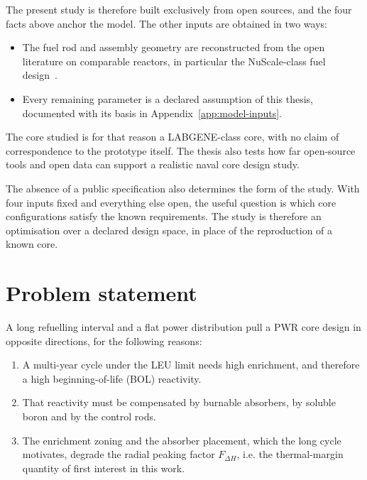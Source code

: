 The present study is therefore built exclusively from open sources, and the
four facts above anchor the model. The other inputs are obtained in two
ways:

\begin{itemize}
  \item The fuel rod and assembly geometry are reconstructed from the
        open literature on comparable reactors, in particular the
        NuScale-class fuel design~\cite{nuscale_htp2_2017}.

  \item Every remaining parameter is a declared assumption of this
        thesis, documented with its basis in
        Appendix~\ref{app:model-inputs}.
\end{itemize}

The core studied is for that reason a LABGENE-class core, with no claim
of correspondence to the prototype itself. The thesis also tests how
far open-source tools and open data can support a realistic naval core
design study.

The absence of a public specification also determines the form of the
study. With four inputs fixed and everything else open, the useful
question is which core configurations satisfy the known requirements.
The study is therefore an optimisation over a declared design space,
in place of the reproduction of a known core.

\section{Problem statement}
\label{sec:intro-problem}

A long refuelling interval and a flat power distribution pull a PWR
core design in opposite directions, for the following reasons:

\begin{enumerate}
  \item A multi-year cycle under the LEU limit needs high enrichment,
        and therefore a high beginning-of-life (BOL) reactivity.

  \item That reactivity must be compensated by burnable absorbers, by
        soluble boron and by the control rods.

  \item The enrichment zoning and the absorber placement, which the long
        cycle motivates, degrade the radial peaking factor
        $F_{\Delta H}$, i.e. the thermal-margin quantity of first interest
        in this work.
\end{enumerate}


